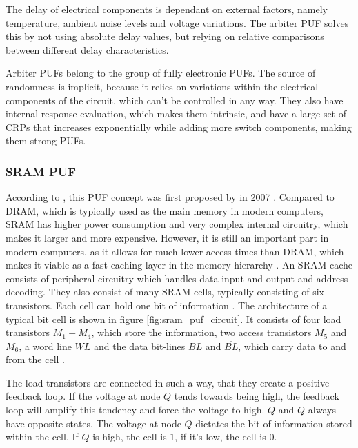 The delay of electrical components is dependant on external factors, namely
temperature, ambient noise levels and voltage variations.
The arbiter PUF solves this by not using absolute delay values, but relying on relative comparisons
between different delay characteristics. \cite[][p. 176]{Lee}

Arbiter PUFs belong to the group of fully electronic PUFs. The source of randomness is implicit, because it relies
on variations within the electrical components of the circuit, which can't be controlled in any way.
They also have internal response evaluation, which makes them intrinsic, and have a large set of \acp{CRP}
that increases exponentially while adding more switch components, making them strong PUFs. \cite[][p. 176]{Lee}


\subsubsection{SRAM PUF}

According to \cite[][p. 6]{McGrath2019}, this PUF concept was first proposed by \citeauthor*{Guajardo} in 2007 \cite{Guajardo}.
Compared to \ac{DRAM}, which is typically used as the main memory in modern computers, \ac{SRAM}
has higher power consumption and very complex internal circuitry, which makes it larger and more expensive.
However, it is still an important part in modern computers, as it allows for much lower access times than \ac{DRAM},
which makes it viable as a fast caching layer in the memory hierarchy \cite[][p. 2f]{Singh2013}.
An SRAM cache consists of peripheral circuitry which handles data input and output and address decoding.
They also consist of many SRAM cells, typically consisting of six transistors.
Each cell can hold one bit of information \cite[][p. 5]{Singh2013}.
The architecture of a typical bit cell is shown in figure \ref{fig:sram_puf_circuit}.
It consists of four load transistors $M_1 - M_4$, which store the information, two access transistors $M_5$ and $M_6$, a word line
$WL$ and the data bit-lines $BL$ and $\overline{BL}$, which carry data to and from the cell \cite[][p. 73]{Guajardo}.

The load transistors are connected in such a way, that they create a positive feedback loop.
If the voltage at node $Q$ tends towards being high, the feedback loop will amplify this tendency
and force the voltage to high. $Q$ and $\overline{Q}$ always have opposite states.
The voltage at node $Q$ dictates the bit of information stored within the cell. If $Q$ is high, the cell is $1$,
if it's low, the cell is $0$. \cite[][p. 31]{Singh2013}

